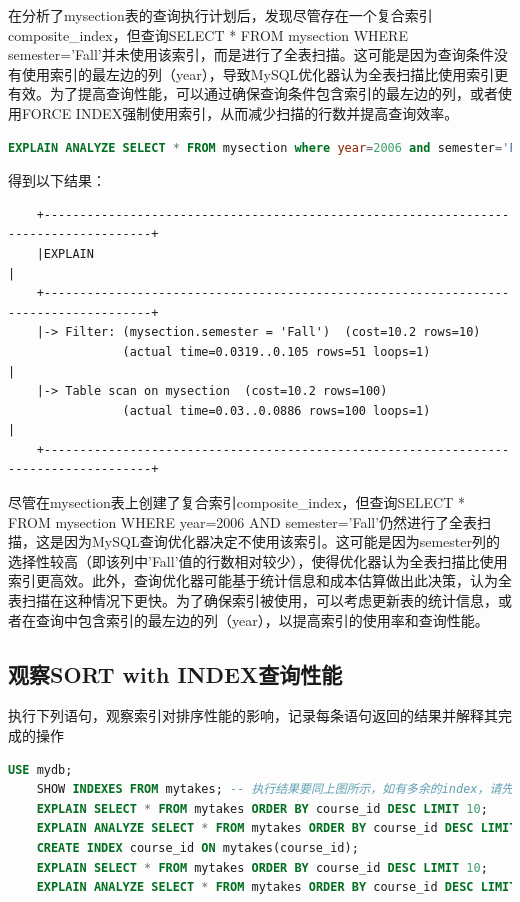 \documentclass{article}
\begin{document}
	在分析了mysection表的查询执行计划后，发现尽管存在一个复合索引composite\_index，但查询SELECT * FROM mysection WHERE semester='Fall'并未使用该索引，而是进行了全表扫描。这可能是因为查询条件没有使用索引的最左边的列（year），导致MySQL优化器认为全表扫描比使用索引更有效。为了提高查询性能，可以通过确保查询条件包含索引的最左边的列，或者使用FORCE INDEX强制使用索引，从而减少扫描的行数并提高查询效率。	
	\begin{lstlisting}[language=sql, title=索引对查询性能的影响, tabsize=4]
		EXPLAIN ANALYZE SELECT * FROM mysection where year=2006 and semester='Fall';
	\end{lstlisting}
	
	得到以下结果：
	
	\begin{verbatim}
	+-------------------------------------------------------------------------------------+
	|EXPLAIN                                                                              |
	+-------------------------------------------------------------------------------------+
	|-> Filter: (mysection.semester = 'Fall')  (cost=10.2 rows=10)
	            (actual time=0.0319..0.105 rows=51 loops=1)                               |
	|-> Table scan on mysection  (cost=10.2 rows=100) 
	            (actual time=0.03..0.0886 rows=100 loops=1)                               |
	+-------------------------------------------------------------------------------------+
	\end{verbatim}
	
	尽管在mysection表上创建了复合索引composite\_index，但查询SELECT * FROM mysection WHERE year=2006 AND semester='Fall'仍然进行了全表扫描，这是因为MySQL查询优化器决定不使用该索引。这可能是因为semester列的选择性较高（即该列中'Fall'值的行数相对较少），使得优化器认为全表扫描比使用索引更高效。此外，查询优化器可能基于统计信息和成本估算做出此决策，认为全表扫描在这种情况下更快。为了确保索引被使用，可以考虑更新表的统计信息，或者在查询中包含索引的最左边的列（year），以提高索引的使用率和查询性能。
	
	\subsection{观察SORT with INDEX查询性能}
	
	执行下列语句，观察索引对排序性能的影响，记录每条语句返回的结果并解释其完成的操作
	
	\begin{lstlisting}[language=sql, title=索引对排序性能的影响, tabsize=4]
	USE mydb;
	SHOW INDEXES FROM mytakes; -- 执行结果要同上图所示，如有多余的index，请先drop删除掉
	EXPLAIN SELECT * FROM mytakes ORDER BY course_id DESC LIMIT 10;
	EXPLAIN ANALYZE SELECT * FROM mytakes ORDER BY course_id DESC LIMIT 10;
	CREATE INDEX course_id ON mytakes(course_id);
	EXPLAIN SELECT * FROM mytakes ORDER BY course_id DESC LIMIT 10;
	EXPLAIN ANALYZE SELECT * FROM mytakes ORDER BY course_id DESC LIMIT 10;	
	\end{lstlisting}
	
\end{document}
